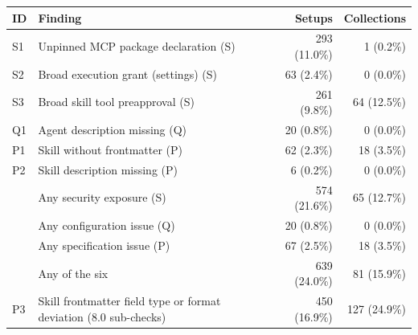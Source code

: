 \begin{tabular}{@{}llrr@{}}
\toprule
ID & Finding & Setups & Collections \\
\midrule
S1 & Unpinned MCP package declaration (S) & 293 (11.0\%) & 1 (0.2\%) \\
S2 & Broad execution grant (settings) (S) & 63 (2.4\%) & 0 (0.0\%) \\
S3 & Broad skill tool preapproval (S) & 261 (9.8\%) & 64 (12.5\%) \\
Q1 & Agent description missing (Q) & 20 (0.8\%) & 0 (0.0\%) \\
P1 & Skill without frontmatter (P) & 62 (2.3\%) & 18 (3.5\%) \\
P2 & Skill description missing (P) & 6 (0.2\%) & 0 (0.0\%) \\
\midrule
 & Any security exposure (S) & 574 (21.6\%) & 65 (12.7\%) \\
 & Any configuration issue (Q) & 20 (0.8\%) & 0 (0.0\%) \\
 & Any specification issue (P) & 67 (2.5\%) & 18 (3.5\%) \\
 & Any of the six & 639 (24.0\%) & 81 (15.9\%) \\
\midrule
P3 & Skill frontmatter field type or format deviation (8.0 sub-checks) & 450 (16.9\%) & 127 (24.9\%) \\
\bottomrule
\end{tabular}
